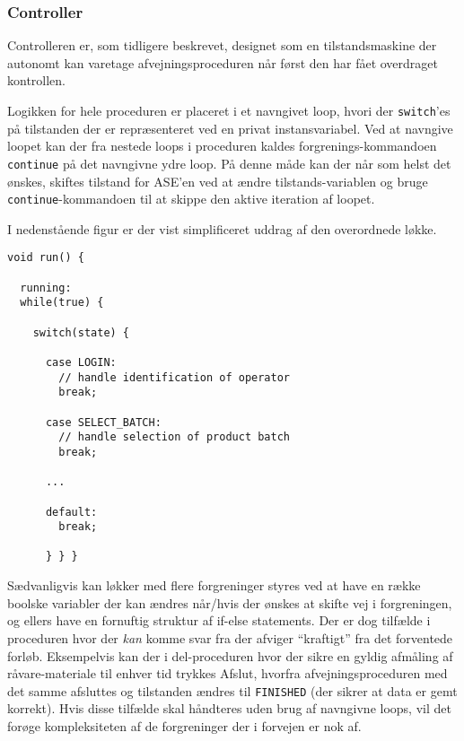 \documentclass[a4paper]{article}
\begin{document}

\subsubsection{Controller} %

Controlleren er, som tidligere beskrevet, designet som en tilstandsmaskine der autonomt kan varetage  afvejningsproceduren når først den har fået overdraget kontrollen.

Logikken for hele proceduren er placeret i et navngivet loop, hvori der \texttt{switch}'es på tilstanden der er repræsenteret ved en privat instansvariabel. Ved at navngive loopet kan der fra nestede loops i proceduren kaldes forgrenings-kommandoen \texttt{continue} på det navngivne ydre loop. På denne måde kan der når som helst det ønskes, skiftes tilstand for ASE'en ved at ændre tilstands-variablen og bruge \texttt{continue}-kommandoen til at skippe den aktive iteration af loopet.

I nedenstående figur er der vist simplificeret uddrag af den overordnede løkke.

\begin{lstlisting}
void run() {

  running:
  while(true) {

    switch(state) {

      case LOGIN:
        // handle identification of operator
        break;

      case SELECT_BATCH:
        // handle selection of product batch
        break;

      ...

      default:
        break;

      } } }
\end{lstlisting}

Sædvanligvis kan løkker med flere forgreninger styres ved at have en række boolske variabler der kan ændres når/hvis der ønskes at skifte vej i forgreningen, og ellers have en fornuftig struktur af if-else statements. Der er dog tilfælde i proceduren hvor der \emph{kan} komme svar fra der afviger ``kraftigt'' fra det forventede forløb. Eksempelvis kan der i del-proceduren hvor der sikre en gyldig afmåling af råvare-materiale til enhver tid trykkes Afslut, hvorfra afvejningsproceduren med det samme afsluttes og tilstanden ændres til \texttt{FINISHED} (der sikrer at data er gemt korrekt). Hvis disse tilfælde skal håndteres uden brug af navngivne loops, vil det forøge kompleksiteten af de forgreninger der i forvejen er nok af.
\end{document}

